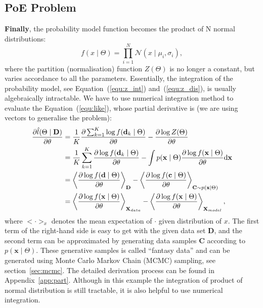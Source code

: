 \subsection{PoE Problem}
	\textbf{Finally}, the probability model function becomes the product of N normal distributions: 
	\begin{equation}
	f(x \mid \Theta ) = \prod_{i=1}^N\mathcal{N}(x \mid \mu_i, \sigma_i ),
	\end{equation}
	where the partition (normalisation) function $Z( \Theta)$ is no longer a constant, but varies accordance to all the parameters.
	Essentially, the integration of the probability model, see Equation~(\ref{equ:z_int}) and~(\ref{equ:z_dis}), is usually algebraically intractable.
	We have to use numerical integration method to evaluate the Equation~(\ref{equ:like}), whose partial derivative is (we are using vectors to generalise the problem):
	\begin{equation}
	\label{equ:part}
	\begin{aligned}
	\dfrac{\partial \hat{l} (\Theta \mid \mathbf{D})}{\partial \theta} 
	& = \frac{1}{K} \dfrac{\partial \sum_{k=1}^K\log f(\mathbf{d}_k \mid \Theta )}{\partial \theta} - \dfrac{\partial \log Z( \Theta)}{\partial \theta}\\
	& =  \frac{1}{K}\sum_{k=1}^K \dfrac{\partial \log f(\mathbf{d}_k \mid \Theta)}{\partial \theta} - \int p(\mathbf{x} \mid \Theta) \dfrac{\partial \log f(\mathbf{x} \mid \Theta)}{\partial \theta} \mathrm{d} \mathbf{x}\\
	& = \left \langle \dfrac{\partial \log f(\mathbf{d} \mid \Theta)}{\partial \theta}\right \rangle_{\mathbf{D}} -\left \langle \dfrac{\partial \log f(\mathbf{c} \mid \Theta)}{\partial \theta}\right \rangle_{\mathbf{C} \sim p(\mathbf{x} \mid \Theta)}  \\
	&=\left \langle \dfrac{\partial \log f(\mathbf{x} \mid \Theta)}{\partial \theta}\right \rangle_{\mathbf{X}_{data}} - \left \langle \dfrac{\partial \log f(\mathbf{x} \mid \Theta)}{\partial \theta}\right \rangle_{\mathbf{X}_{model}},
	\end{aligned}
	\end{equation}
	where  $ <\cdot>_x $ denotes the mean expectation of $ \cdot $ given distribution of $x$.
	The first term of the right-hand side is easy to get with the given data set $ \mathbf{D} $, and the second term can be approximated by generating data samples $ \mathbf{C} $ according to $ p(\mathbf{x} \mid \Theta) $.
	These generative samples is called ``fantasy data'' and can be generated using Monte Carlo Markov Chain (MCMC) sampling, see section~\ref{sec:mcmc}.
	The detailed derivation process can be found in Appendix~\ref{app:part}.
	Although in this example the integration of product of normal distribution is still tractable, it is also helpful to use numerical integration.


